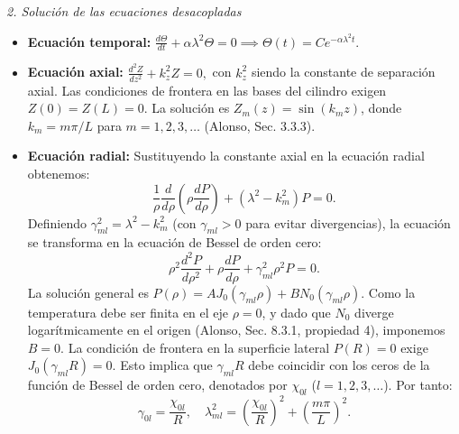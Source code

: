 \documentclass[a4paper]{article}
\begin{document}
\textit{2. Solución de las ecuaciones desacopladas}
\begin{itemize}
\item \textbf{Ecuación temporal:} $\displaystyle \frac{d\Theta}{dt} + \alpha \lambda^2 \Theta = 0 \implies \Theta(t) = C e^{-\alpha \lambda^2 t}.$
\item \textbf{Ecuación axial:} $\displaystyle \frac{d^2 Z}{dz^2} + k_z^2 Z = 0,$ con $k_z^2$ siendo la constante de separación axial. Las condiciones de frontera en las bases del cilindro exigen $Z(0) = Z(L) = 0$. La solución es $Z_m(z) = \sin(k_m z)$, donde $k_m = m\pi/L$ para $m = 1, 2, 3, \dots$ (Alonso, Sec. 3.3.3).
\item \textbf{Ecuación radial:} Sustituyendo la constante axial en la ecuación radial obtenemos:
$$\frac{1}{\rho} \frac{d}{d\rho} \left( \rho \frac{dP}{d\rho} \right) + (\lambda^2 - k_m^2) P = 0.$$
Definiendo $\gamma_{ml}^2 = \lambda^2 - k_m^2$ (con $\gamma_{ml} > 0$ para evitar divergencias), la ecuación se transforma en la ecuación de Bessel de orden cero:
$$\rho^2 \frac{d^2 P}{d\rho^2} + \rho \frac{dP}{d\rho} + \gamma_{ml}^2 \rho^2 P = 0.$$
La solución general es $P(\rho) = A J_0(\gamma_{ml} \rho) + B N_0(\gamma_{ml} \rho)$. Como la temperatura debe ser finita en el eje $\rho = 0$, y dado que $N_0$ diverge logarítmicamente en el origen (Alonso, Sec. 8.3.1, propiedad 4), imponemos $B = 0$. La condición de frontera en la superficie lateral $P(R) = 0$ exige $J_0(\gamma_{ml} R) = 0$. Esto implica que $\gamma_{ml} R$ debe coincidir con los ceros de la función de Bessel de orden cero, denotados por $\chi_{0l}$ ($l = 1, 2, 3, \dots$). Por tanto:
$$\gamma_{0l} = \frac{\chi_{0l}}{R}, \quad \lambda_{ml}^2 = \left( \frac{\chi_{0l}}{R} \right)^2 + \left( \frac{m\pi}{L} \right)^2.$$
\end{itemize}
\end{document}
